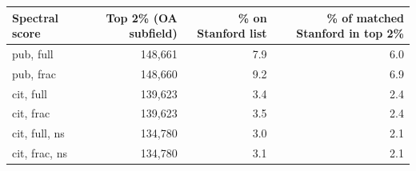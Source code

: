 \begin{tabular}{lrrr}
\toprule
Spectral score & Top 2\% (OA subfield) & \% on Stanford list & \% of matched Stanford in top 2\% \\
\midrule
pub, full & 148{,}661 & 7.9 & 6.0 \\
pub, frac & 148{,}660 & 9.2 & 6.9 \\
cit, full & 139{,}623 & 3.4 & 2.4 \\
cit, frac & 139{,}623 & 3.5 & 2.4 \\
cit, full, ns & 134{,}780 & 3.0 & 2.1 \\
cit, frac, ns & 134{,}780 & 3.1 & 2.1 \\
\bottomrule
\end{tabular}

